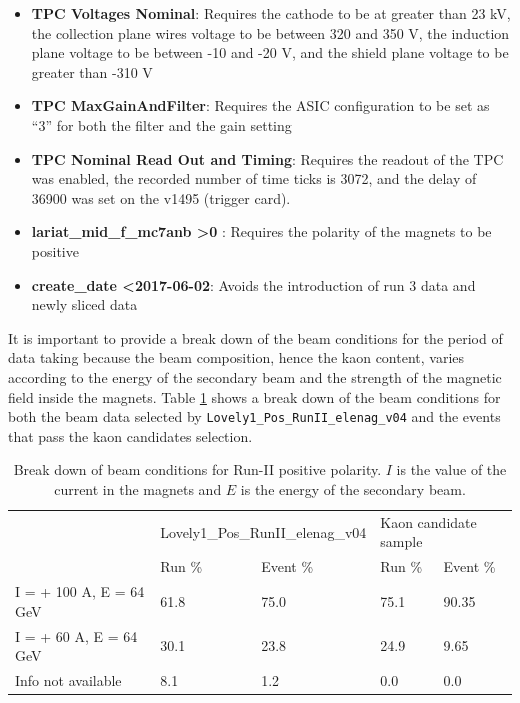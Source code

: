\begin{itemize}
\item \textbf{TPC Voltages Nominal}: Requires the cathode to be at greater than 23 kV, the collection plane wires voltage to be between 320 and 350 V, the induction plane voltage to be between -10 and -20 V, and the shield plane voltage to be greater than -310 V

\item \textbf{TPC MaxGainAndFilter}: Requires the ASIC configuration to be set as ``3'' for both the filter and the gain setting

\item \textbf{TPC Nominal Read Out and Timing}: Requires the readout of the TPC was enabled, the recorded number of time ticks is 3072, and the delay of 36900 was set on the v1495 (trigger card).
\item \textbf{lariat\_mid\_f\_mc7anb \textgreater 0} : Requires the polarity of the magnets to be positive
\item \textbf{create\_date \textless  2017-06-02}: Avoids the introduction of run 3 data and newly sliced data
\end{itemize}


It is important to provide a break down of the beam conditions for the period of data taking because the beam composition, hence the kaon content, varies according to the energy of the secondary beam and the strength of the magnetic field inside the magnets. Table \ref{tab:beamConditions} shows a break down of the beam conditions for both the beam data selected by  \verb!Lovely1_Pos_RunII_elenag_v04! and the events that pass the kaon candidates selection.


\begin{table}[]
\centering
\caption{Break down of beam conditions for Run-II positive polarity. $I$ is the value of the current in the magnets and $E$ is the energy of the secondary beam.  }
\label{tab:beamConditions}
\begin{tabular}{l|l|l|l|l|}
\cline{2-5}
                                       & \multicolumn{2}{l|}{Lovely1\_Pos\_RunII\_elenag\_v04} & \multicolumn{2}{l|}{Kaon candidate sample} \\ \cline{2-5} 
                                       & Run \% & Event \% & Run \% & Event \% \\ \hline
\multicolumn{1}{|l|}{I = + 100 A, E = 64 GeV}   &   61.8          &        75.0   & 75.1  &  90.35   \\ \hline
\multicolumn{1}{|l|}{I =   + 60 A, E = 64 GeV}   &    30.1         &         23.8  & 24.9  &   9.65     \\ \hline
\multicolumn{1}{|l|}{Info not available}              &      8.1         &           1.2   &    0.0 &       0.0               \\ \hline
\end{tabular}
\end{table}



